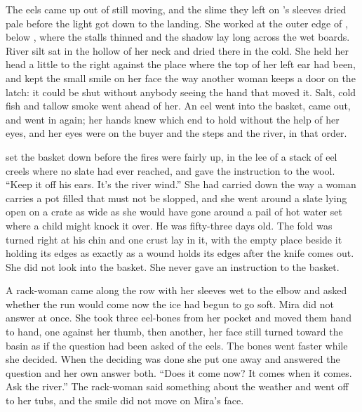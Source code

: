 
The eels came up out of  still moving, and the slime they left on 's sleeves dried pale before the light got down to the landing. She worked at the outer edge of , below , where the stalls thinned and the shadow lay long across the wet boards. River silt sat in the hollow of her neck and dried there in the cold. She held her head a little to the right against the place where the top of her left ear had been, and kept the small smile on her face the way another woman keeps a door on the latch: it could be shut without anybody seeing the hand that moved it. Salt, cold fish and tallow smoke went ahead of her. An eel went into the basket, came out, and went in again; her hands knew which end to hold without the help of her eyes, and her eyes were on the buyer and the steps and the river, in that order.

 set the basket down before the fires were fairly up, in the lee of a stack of eel creels where no slate had ever reached, and gave the instruction to the wool. “Keep it off his ears. It's the river wind.” She had carried  down the way a woman carries a pot filled that must not be slopped, and she went around a slate lying open on a crate as wide as she would have gone around a pail of hot water set where a child might knock it over. He was fifty-three days old. The fold was turned right at his chin and one crust lay in it, with the empty place beside it holding its edges as exactly as a wound holds its edges after the knife comes out. She did not look into the basket. She never gave an instruction to the basket.

A rack-woman came along the row with her sleeves wet to the elbow and asked whether the run would come now the ice had begun to go soft. Mira did not answer at once. She took three eel-bones from her pocket and moved them hand to hand, one against her thumb, then another, her face still turned toward the basin as if the question had been asked of the eels. The bones went faster while she decided. When the deciding was done she put one away and answered the question and her own answer both. “Does it come now? It comes when it comes. Ask the river.” The rack-woman said something about the weather and went off to her tubs, and the smile did not move on Mira's face.

